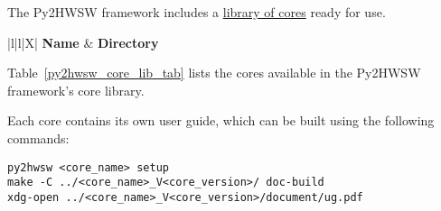 %

The Py2HWSW framework includes a \href{https://github.com/IObundle/py2hwsw/tree/main/py2hwsw/lib}{library of cores} ready for use.

\begin{xltabular}{\textwidth}{|l|l|X|}
  \hline
  {\bf Name} & {\bf Directory}  \\ \hline \hline
  \endhead

  

  \caption{Table of cores available in the library of the Py2HWSW framework. The \textit{Directory} column is the path to the core's setup directory, relative to the Py2HWSW lib directory \texttt{py2hwsw/lib/}.}
  \label{py2hwsw_core_lib_tab}
\end{xltabular}

Table~\ref{py2hwsw_core_lib_tab} lists the cores available in the Py2HWSW framework's core library.

Each core contains its own user guide, which can be built using the following commands:

\begin{lstlisting}
py2hwsw <core_name> setup
make -C ../<core_name>_V<core_version>/ doc-build
xdg-open ../<core_name>_V<core_version>/document/ug.pdf
\end{lstlisting}
